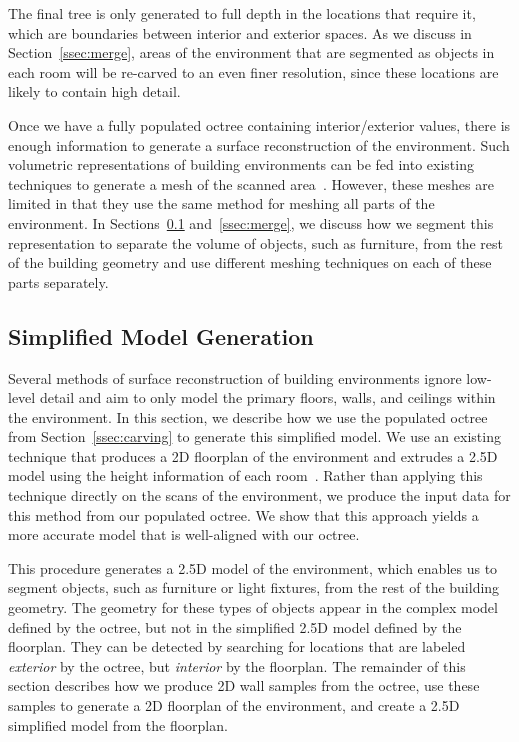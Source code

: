 \documentclass[review]{acmsiggraph}
\begin{document}
The final tree is only generated to full depth in the locations that require it, which are boundaries between interior and exterior spaces.  As we discuss in Section~\ref{ssec:merge}, areas of the environment that are segmented as objects in each room will be re-carved to an even finer resolution, since these locations are likely to contain high detail.

Once we have a fully populated octree containing interior/exterior values, there is enough information to generate a surface reconstruction of the environment.  Such volumetric representations of building environments can be fed into existing techniques to generate a mesh of the scanned area~\cite{Turner13,Kintinuous,Carving}.  However, these meshes are limited in that they use the same method for meshing all parts of the environment.  In Sections~\ref{ssec:floorplan} and~\ref{ssec:merge}, we discuss how we segment this representation to separate the volume of objects, such as furniture, from the rest of the building geometry and use different meshing techniques on each of these parts separately.

\subsection{Simplified Model Generation}
\label{ssec:floorplan}

Several methods of surface reconstruction of building environments ignore low-level detail and aim to only model the primary floors, walls, and ceilings within the environment.  In this section, we describe how we use the populated octree from Section~\ref{ssec:carving} to generate this simplified model.  We use an existing technique that produces a 2D floorplan of the environment and extrudes a 2.5D model using the height information of each room~\cite{Turner14}.  Rather than applying this technique directly on the scans of the environment, we produce the input data for this method from our populated octree.  We show that this approach yields a more accurate model that is well-aligned with our octree.  

This procedure generates a 2.5D model of the environment, which enables us to segment objects, such as furniture or light fixtures, from the rest of the building geometry.  The geometry for these types of objects appear in the complex model defined by the octree, but not in the simplified 2.5D model defined by the floorplan.  They can be detected by searching for locations that are labeled {\it exterior} by the octree, but {\it interior} by the floorplan.  The remainder of this section describes how we produce 2D wall samples from the octree, use these samples to generate a 2D floorplan of the environment, and create a 2.5D simplified model from the floorplan.
\end{document}

